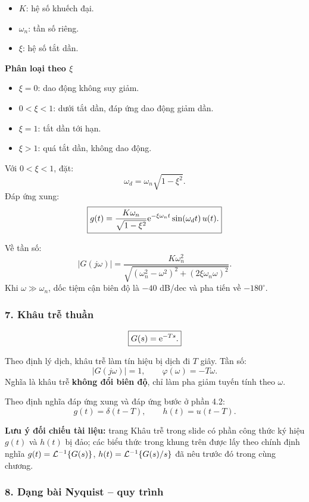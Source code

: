 \begin{itemize}
  \item $K$: hệ số khuếch đại.
  \item $\omega_n$: tần số riêng.
  \item $\xi$: hệ số tắt dần.
\end{itemize}

\textbf{Phân loại theo $\xi$}
\begin{itemize}
  \item $\xi=0$: dao động không suy giảm.
  \item $0<\xi<1$: dưới tắt dần, đáp ứng dao động giảm dần.
  \item $\xi=1$: tắt dần tới hạn.
  \item $\xi>1$: quá tắt dần, không dao động.
\end{itemize}

Với $0<\xi<1$, đặt:
\[
\omega_d=\omega_n\sqrt{1-\xi^2}.
\]
Đáp ứng xung:
\[
\boxed{
g(t)=
\frac{K\omega_n}{\sqrt{1-\xi^2}}
\mathrm{e}^{-\xi\omega_nt}
\sin(\omega_dt)\,u(t).
}
\]

Về tần số:
\[
|G(j\omega)|
=
\frac{K\omega_n^2}
{\sqrt{(\omega_n^2-\omega^2)^2+(2\xi\omega_n\omega)^2}}.
\]
Khi $\omega\gg\omega_n$, dốc tiệm cận biên độ là $-40$ dB/dec và pha tiến về $-180^\circ$.

\subsubsection*{7. Khâu trễ thuần}

\[
\boxed{
G(s)=\mathrm{e}^{-Ts}.
}
\]

Theo định lý dịch, khâu trễ làm tín hiệu bị dịch đi $T$ giây.
Tần số:
\[
\boxed{
|G(j\omega)|=1,\qquad
\varphi(\omega)=-T\omega.
}
\]
Nghĩa là khâu trễ \textbf{không đổi biên độ}, chỉ làm pha giảm tuyến tính theo $\omega$.

Theo định nghĩa đáp ứng xung và đáp ứng bước ở phần 4.2:
\[
\boxed{
g(t)=\delta(t-T),\qquad h(t)=u(t-T).
}
\]

\textbf{Lưu ý đối chiếu tài liệu:}
trang Khâu trễ trong slide có phần công thức ký hiệu $g(t)$ và $h(t)$ bị đảo;
các biểu thức trong khung trên được lấy theo chính định nghĩa $g(t)=\mathcal{L}^{-1}\{G(s)\}$,
$h(t)=\mathcal{L}^{-1}\{G(s)/s\}$ đã nêu trước đó trong cùng chương.

\subsubsection*{8. Dạng bài Nyquist -- quy trình}

